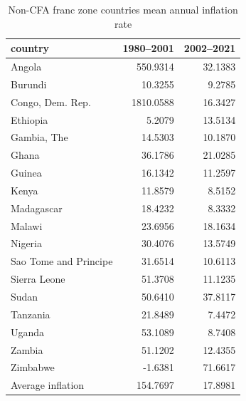 \begin{table}

\caption{Non-CFA franc zone countries mean annual inflation rate}
\centering
\begin{tabular}[t]{lrr}
\toprule
country & 1980--2001 & 2002--2021\\
\midrule
Angola & 550.9314 & 32.1383\\
Burundi & 10.3255 & 9.2785\\
Congo, Dem. Rep. & 1810.0588 & 16.3427\\
Ethiopia & 5.2079 & 13.5134\\
Gambia, The & 14.5303 & 10.1870\\
\addlinespace
Ghana & 36.1786 & 21.0285\\
Guinea & 16.1342 & 11.2597\\
Kenya & 11.8579 & 8.5152\\
Madagascar & 18.4232 & 8.3332\\
Malawi & 23.6956 & 18.1634\\
\addlinespace
Nigeria & 30.4076 & 13.5749\\
Sao Tome and Principe & 31.6514 & 10.6113\\
Sierra Leone & 51.3708 & 11.1235\\
Sudan & 50.6410 & 37.8117\\
Tanzania & 21.8489 & 7.4472\\
\addlinespace
Uganda & 53.1089 & 8.7408\\
Zambia & 51.1202 & 12.4355\\
Zimbabwe & -1.6381 & 71.6617\\
Average inflation & 154.7697 & 17.8981\\
\bottomrule
\end{tabular}
\end{table}
